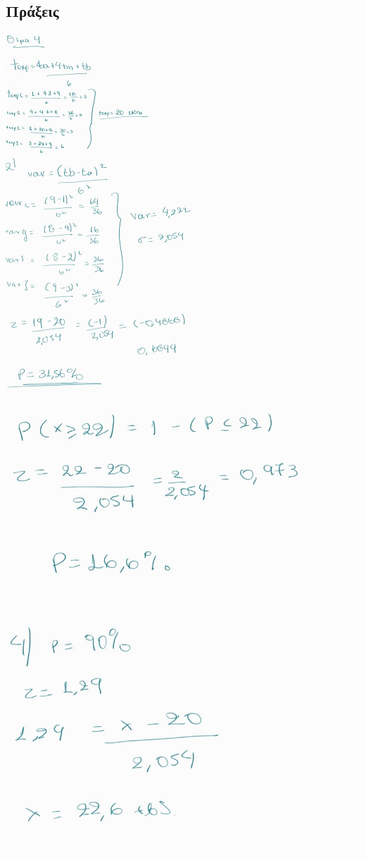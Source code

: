 \documentclass[12pt]{turabian-researchpaper}
\begin{document}
\subsection*{Πράξεις}

\includegraphics[scale=1.2]{4_i.jpg}

\includegraphics[scale=0.42]{4_ii.jpg}
\end{document}
